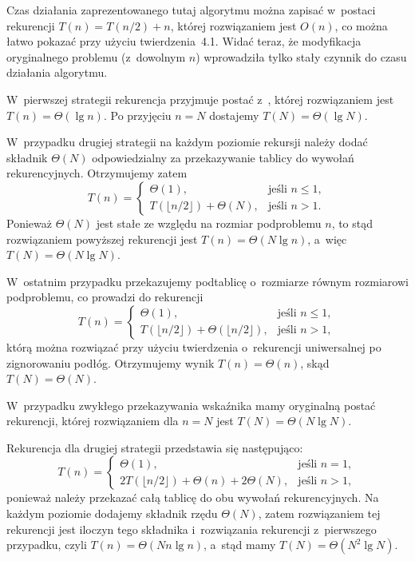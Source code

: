 Czas działania zaprezentowanego tutaj algorytmu można zapisać w~postaci rekurencji $T(n)=T(n/2)+n$, której rozwiązaniem jest $O(n)$, co można łatwo pokazać przy użyciu twierdzenia~4.1. Widać teraz, że modyfikacja oryginalnego problemu (z~dowolnym $n$) wprowadziła tylko stały czynnik do czasu działania algorytmu.


\subproblem %
W~pierwszej strategii rekurencja przyjmuje postać z~, której rozwiązaniem jest $T(n)=\Theta(\lg n)$. Po przyjęciu $n=N$ dostajemy $T(N)=\Theta(\lg N)$.

W~przypadku drugiej strategii na każdym poziomie rekursji należy dodać składnik $\Theta(N)$ odpowiedzialny za przekazywanie tablicy do wywołań rekurencyjnych. Otrzymujemy zatem
\[
	T(n) = \begin{cases}
		\Theta(1), & \text{jeśli $n\le1$}, \\
		T(\lfloor n/2\rfloor)+\Theta(N), & \text{jeśli $n>1$}.
	\end{cases}
\]
Ponieważ $\Theta(N)$ jest stałe ze względu na rozmiar podproblemu $n$, to stąd rozwiązaniem powyższej rekurencji jest $T(n)=\Theta(N\lg n)$, a~więc $T(N)=\Theta(N\lg N)$.

W~ostatnim przypadku przekazujemy podtablicę o~rozmiarze równym rozmiarowi podproblemu, co prowadzi do rekurencji
\[
	T(n) = \begin{cases}
		\Theta(1), & \text{jeśli $n\le1$}, \\
		T(\lfloor n/2\rfloor)+\Theta(\lfloor n/2\rfloor), & \text{jeśli $n>1$},
	\end{cases}
\]
którą można rozwiązać przy użyciu twierdzenia o~rekurencji uniwersalnej po zignorowaniu podłóg. Otrzymujemy wynik $T(n)=\Theta(n)$, skąd $T(N)=\Theta(N)$.

\subproblem %
W~przypadku zwykłego przekazywania wskaźnika mamy oryginalną postać rekurencji, której rozwiązaniem dla $n=N$ jest $T(N)=\Theta(N\lg N)$.

Rekurencja dla drugiej strategii przedstawia się następująco:
\[
	T(n) = \begin{cases}
		\Theta(1), & \text{jeśli $n=1$}, \\
		2T(\lfloor n/2\rfloor)+\Theta(n)+2\Theta(N), & \text{jeśli $n>1$},
	\end{cases}
\]
ponieważ należy przekazać całą tablicę do obu wywołań rekurencyjnych. Na każdym poziomie dodajemy składnik rzędu $\Theta(N)$, zatem rozwiązaniem tej rekurencji jest iloczyn tego składnika i~rozwiązania rekurencji z~pierwszego przypadku, czyli $T(n)=\Theta(Nn\lg n)$, a~stąd mamy $T(N)=\Theta(N^2\lg N)$.

